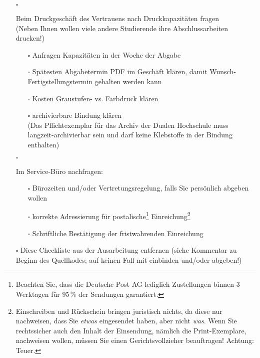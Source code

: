 \begin{itemize}
{        \begin{itemize}
             \item[$\square$]{
                Beim Druckgeschäft des Vertrauens nach Druckkapazitäten fragen\\
                (Neben Ihnen wollen viele andere Studierende ihre Abschlussarbeiten drucken!)
                \begin{itemize}
                    \item[$\square$] Anfragen Kapazitäten in der Woche der Abgabe
                    \item[$\square$] Spätesten Abgabetermin PDF im Geschäft klären, damit Wunsch-Fer\-tig\-stel\-lungs\-ter\-min gehalten werden kann
                    \item[$\square$] Kosten Graustufen- vs. Farbdruck klären
                    \item[$\square$]{
                        archivierbare Bindung klären\\
                        (Das Pflichtexemplar für das Archiv der Dualen Hochschule muss langzeit-ar\-chi\-vier\-bar sein und darf keine Klebstoffe in der Bindung enthalten)
                    }
                \end{itemize}
            }
            \item[$\square$]{
                Im Service-Büro nachfragen:
                \begin{itemize}
                    \item[$\square$] Bürozeiten und/oder Vertretungsregelung, falls Sie persönlich abgeben wollen
                    \item[$\square$] korrekte Adressierung für postalische\footnote{Beachten Sie, dass die Deutsche Post AG lediglich Zustellungen binnen $3$ Werktagen für $95\,\%$ der Sendungen garantiert.} Einreichung\footnote{Einschreiben und Rückschein bringen juristisch nichts, da diese nur nachweisen, dass Sie \emph{etwas} eingesendet haben, aber nicht \emph{was}. Wenn Sie rechtssicher auch den Inhalt der Einsendung, nämlich die Print-Exemplare, nachweisen wollen, müssen Sie einen Gerichtsvollzieher beauftragen! Achtung: Teuer.}
                    \item[$\square$] Schriftliche Bestätigung der fristwahrenden Einreichung
                \end{itemize}
            }
            \item[$\square$]{\color{red}
                Diese Checkliste aus der Ausarbeitung entfernen (siehe Kommentar zu Beginn des Quellkodes; auf keinen Fall mit einbinden und/oder abgeben!)
}
\end{itemize}}
\end{itemize}
